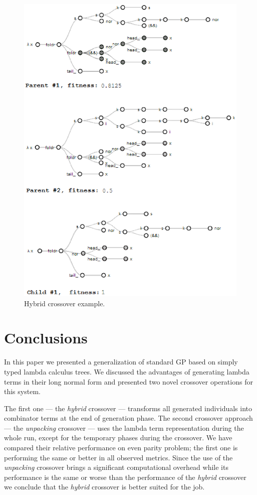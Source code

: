 \documentclass{sig-alternate}
\newcommand{\red}[1]{{\color{red} #1}}
\begin{document}
\begin{figure}[!ht]
  \centering
  \caption{Hybrid crossover example.}
  \includegraphics[scale=0.46]{crossover2.eps} %
\end{figure}


\section{Conclusions}
\label{conclusions}

In this paper we presented a generalization of standard GP based on simply typed lambda calculus trees. We discussed the advantages of generating lambda terms in their long normal form and presented two novel crossover operations for this system.

The first one --- the \textit{hybrid} crossover --- transforms all generated individuals into combinator terms at the end of generation phase. The second crossover approach --- the \textit{unpacking} crossover --- uses the lambda term representation during the whole run, except for the temporary phases during the crossover. We have compared their relative performance on even parity problem; the first one is performing the same or better in all observed metrics. Since the use of the \textit{unpacking} crossover brings a significant computational overhead while its performance is the same or worse than the performance of the \textit{hybrid} crossover we conclude that 
the \textit{hybrid} crossover is better suited for the job.
\end{document}
